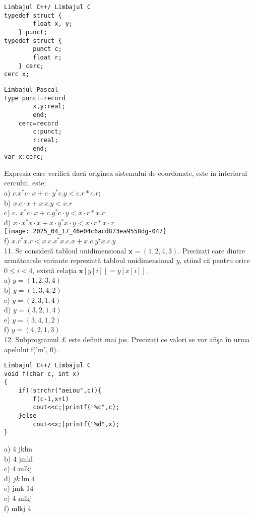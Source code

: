 \begin{verbatim}
Limbajul C++/ Limbajul C
typedef struct {
        float x, y;
    } punct;
typedef struct {
        punct c;
        float r;
    } cerc;
cerc x;
\end{verbatim}

\begin{verbatim}
Limbajul Pascal
type punct=record
        x,y:real;
        end;
    cerc=record
        c:punct;
        r:real;
        end;
var x:cerc;
\end{verbatim}

Expresia care verifică dacă originea sistemului de coordonate, este în interiorul cercului, este:\\
a) $c . x^{*} c \cdot x+c \cdot y^{*} c . y<c . r * c . r ;$\\
b) $x . c \cdot x+x . c . y<x . r$\\
c) c. $x^{*} c \cdot x+c . y^{*} c \cdot y<x \cdot r * x . r$\\
d) $x \cdot x^{*} x \cdot x+x \cdot y^{*} x \cdot y<x \cdot r * x \cdot r$\\
\texttt{[image: 2025\_04\_17\_46e04c6acd873ea9558dg-047]}\\
f) $x . r^{*} x . r<x . c . x^{*} x . c . x+x . c . y^{\star} x . c . y$\\
11. Se consideră tabloul unidimensional $\mathbf{x}=(1,2,4,3)$. Precizați care dintre următoarele variante reprezintă tabloul unidimensional $y$, știind că pentru orice $0 \leq i<4$, există relaţia $\mathbf{x}[y[i]]=y[x[i]]$.\\
a) $y=(1,2,3,4)$\\
b) $y=(1,3,4,2)$\\
c) $y=(2,3,1,4)$\\
d) $y=(3,2,1,4)$\\
e) $y=(3,4,1,2)$\\
f) $y=(4,2,1,3)$\\
12. Subprogramul $\pounds$ este definit mai jos. Precizați ce valori se vor afişa în urma apelului f('m', 0).

\begin{verbatim}
Limbajul C++/ Limbajul C
void f(char c, int x)
{
    if(!strchr("aeiou",c)){
        f(c-1,x+1)
        cout<<c;|printf("%c",c);
    }else
        cout<<x;|printf("%d",x);
}
\end{verbatim}

a) 4 jklm\\
b) 4 jmkl\\
c) 4 mlkj\\
d) $j k \operatorname{lm} 4$\\
e) jmk 14\\
c) 4 mlkj\\
f) mlkj 4

